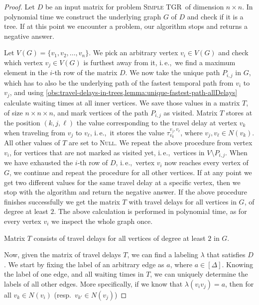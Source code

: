 \documentclass[a4paper,UKenglish,cleveref, autoref, thm-restate,anonymous]{lipics-v2021}
\newcommand{\ie}{i.\,e.,\ }
\newcommand{\deltaExact}{\textsc{Simple TGR}}
\begin{document}
\begin{proof}
    Let $D$ be an input matrix for problem \deltaExact\ of dimension $n \times n$.
    In polynomial time we construct the underlying graph $G$ of $D$ and check if it is a tree.
    If at this point we encounter a problem, our algorithm stops and returns a negative answer.

    Let $V(G) = \{v_1, v_2, \dots, v_n\}$.
    We pick an arbitrary vertex $v_i \in V(G)$ and check which vertex $v_j \in V(G)$ is furthest away from it, \ie we find a maximum element in the $i$-th row of the matrix $D$.
    We now take the unique path $P_{i,j}$ in $G$, 
    which has to also be the underlying path of the fastest temporal path from $v_i$ to $v_j$, and using \cref{obs:travel-delays-in-trees,lemma:unique-fastest-path-allDelays} calculate waiting times at all inner vertices.
    We save those values in a matrix $T$, of size $n \times n \times n$, and mark vertices of the path  $P_{i,j}$ as visited.
    Matrix $T$ stores at the position $(k,j,\ell)$ the value corresponding to the travel delay at vertex $v_k$ when traveling from $v_{j}$ to $v_{\ell}$, 
    \ie it stores the value $\tau_{v_k}^{v_{j}, v_\ell}$, where $v_j,v_\ell \in N(v_k)$. All other values of $T$ are set to \textsc{Null}.
    We repeat the above procedure from vertex $v_i$, for vertices that are not marked as visited yet, \ie vertices in $V \setminus P_{i,j}$.
    When we have exhausted the $i$-th row of $D$,
    \ie vertex $v_i$ now reaches every vertex of $G$,
    we continue and repeat the procedure for all other vertices.
    If at any point we get two different values for the same travel delay at a specific vertex, then we stop with the algorithm and return the negative answer.
    If the above procedure finishes successfully we get the matrix $T$ with travel delays for all vertices in $G$, of degree at least $2$.
    The above calculation is performed in polynomial time, as for every vertex $v_i$ we inspect the whole graph once.
    \begin{claim}[$\star$]\label{lemma:matrixT-travelDelays-tree}
        Matrix $T$ consists of travel delays for all vertices of degree at least $2$ in $G$.
    \end{claim}
    Now, given the matrix of travel delays $T$, we can find a labeling $\lambda$ that satisfies $D$.
    We start by fixing the label of an arbitrary edge as $a$, where $a \in [\Delta]$.
    Knowing the label of one edge, and all waiting times in $T$, we can uniquely determine the labels of all other edges.
    More specifically, if we know that $\lambda(v_i v_j) = a$, then for all $v_k \in N(v_i)$ (resp.~$v_{k'} \in N(v_j)$)

\end{proof}
\end{document}

